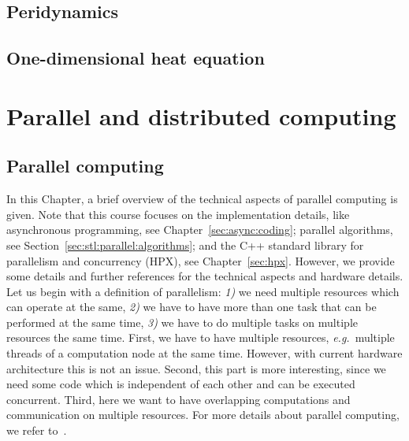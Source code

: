 \documentclass[11pt,fleqn]{book} %
\begin{document}
\chapter{Peridynamics}
\label{sec:pd}


\chapter{One-dimensional heat equation}



\newpage
\theendnotes


\part{Parallel and distributed computing}

\chapter{Parallel computing}
In this Chapter, a brief overview of the technical aspects of parallel computing is given. Note that this course focuses on the implementation details, like asynchronous programming, see Chapter~\ref{sec:async:coding}; parallel algorithms, see Section~\ref{sec:stl:parallel:algorithms}; and the C++ standard library for parallelism and concurrency (HPX), see Chapter~\ref{sec:hpx}. However, we provide some details and further references for the technical aspects and hardware details.\\

Let us begin with a definition of parallelism: \textit{1)} we need multiple resources which can operate at the same, \textit{2)} we have to have more than one task that can be performed at the same time, \textit{3)} we have to do multiple tasks on multiple resources the same time. First, we have to have multiple resources, \emph{e.g.}\ multiple threads of a computation node at the same time. However, with current hardware architecture this is not an issue. Second, this part is more interesting, since we need some code which is independent of each other and can be executed concurrent. Third, here we want to have overlapping computations and communication on multiple resources. For more details about parallel computing, we refer to~\cite{grama2003introduction,trobec2018introduction}.\\
\end{document}
